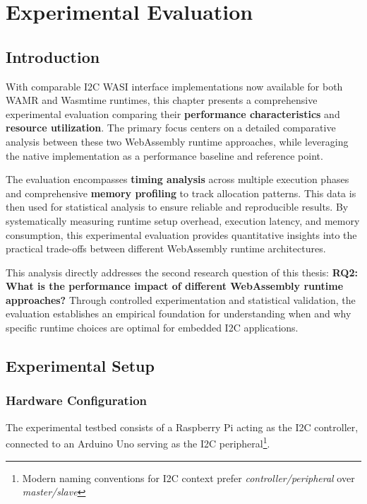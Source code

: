 \chapter{Experimental Evaluation}
\label{chap:5}

\section{Introduction}
\label{sec:eval-intro}


With comparable I2C WASI interface implementations now available for both WAMR and Wasmtime runtimes, this chapter presents a comprehensive experimental evaluation comparing their \textbf{performance characteristics} and \textbf{resource utilization}. The primary focus centers on a detailed comparative analysis between these two WebAssembly runtime approaches, while leveraging the native implementation as a performance baseline and reference point.

The evaluation encompasses \textbf{timing analysis} across multiple execution phases and comprehensive \textbf{memory profiling} to track allocation patterns. This data is then used for statistical analysis to ensure reliable and reproducible results. By systematically measuring runtime setup overhead, execution latency, and memory consumption, this experimental evaluation provides quantitative insights into the practical trade-offs between different WebAssembly runtime architectures.

This analysis directly addresses the second research question of this thesis: \textbf{RQ2: What is the performance impact of different WebAssembly runtime approaches?} Through controlled experimentation and statistical validation, the evaluation establishes an empirical foundation for understanding when and why specific runtime choices are optimal for embedded I2C applications.

\section{Experimental Setup}
\label{sec:experimental-setup}

\subsection{Hardware Configuration}
\label{subsec:hardware-config}

The experimental testbed consists of a Raspberry Pi acting as the I2C controller, connected to an Arduino Uno serving as the I2C peripheral\footnote{Modern naming conventions for I2C context prefer \textit{controller/peripheral} over \textit{master/slave}}.

